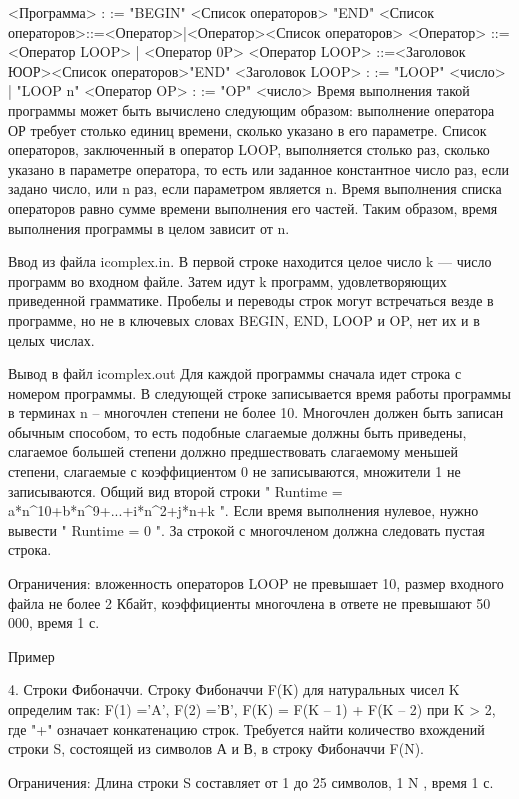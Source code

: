 \documentclass[]{article}
\begin{document}
<Программа> : := "BEGIN" <Список операторов> "END" 
<Список операторов>::=<Оператор>|<Оператор><Список операторов> 
<Оператор> ::=<Оператор LOOP> | <Оператор 0P> 
<Оператор LOOP> ::=<Заголовок ЮОР><Список операторов>"END" 
<Заголовок LOOP> : := "LOOP" <число> | "LOOP n" 
<Оператор OP> : := "OP" <число>
Время выполнения такой программы может быть вычислено следующим образом: выполнение оператора ОР требует столько единиц времени, сколько указано в его параметре. Список операторов, заключенный в оператор LOOP, выполняется столько раз, сколько указано в параметре оператора, то есть или заданное константное число раз, если задано число, или n раз, если параметром является n. Время выполнения списка операторов равно сумме времени выполнения его частей. Таким образом, время выполнения программы в целом зависит от n.

Ввод из файла icomplex.in. В первой строке находится целое число k — число программ во входном файле. Затем идут k программ, удовлетворяющих приведенной грамматике. Пробелы и переводы строк могут встречаться везде в программе, но не в ключевых словах BEGIN, END, LOOP и OP, нет их и в целых числах.

Вывод в файл icomplex.out Для каждой программы сначала идет строка с номером программы. В следующей строке записывается время работы программы в терминах n – многочлен степени не более 10. Многочлен должен быть записан обычным способом, то есть подобные слагаемые должны быть приведены, слагаемое большей степени должно предшествовать слагаемому меньшей степени, слагаемые с коэффициентом 0 не записываются, множители 1 не записываются. Общий вид второй строки " Runtime = a*n^10+b*n^9+...+i*n^2+j*n+k ". Если время выполнения нулевое, нужно вывести " Runtime = 0 ". За строкой с многочленом должна следовать пустая строка.

Ограничения: вложенность операторов LOOP не превышает 10, размер входного файла не более 2 Кбайт, коэффициенты многочлена в ответе не превышают 50 000, время 1 с.

Пример



4. Строки Фибоначчи. Строку Фибоначчи F(K) для натуральных чисел K определим так: F(1) ='A', F(2) ='В', F(K) = F(K – 1) + F(K – 2) при K > 2, где "+" означает конкатенацию строк. Требуется найти количество вхождений строки S, состоящей из символов А и В, в строку Фибоначчи F(N).

Ограничения: Длина строки S составляет от 1 до 25 символов, 1 \leq N , время 1 с.
\end{document}
